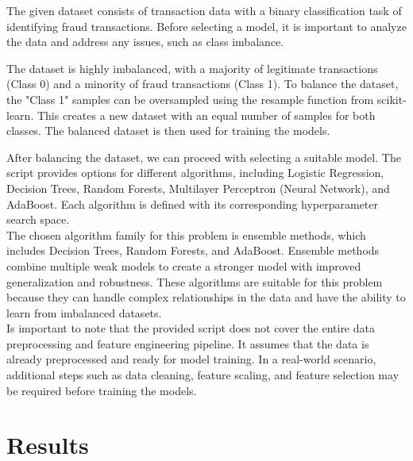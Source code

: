 \documentclass[a4, 10 pt, conference]{ieeeconf}  %
\begin{document}
{\color{black}

\begin{itemize} 
	\textbfn The given dataset consists of transaction data with a binary classification task of identifying fraud transactions. Before selecting a model, it is important to analyze the data and address any issues, such as class imbalance.\newline

	\textbfn The dataset is highly imbalanced, with a majority of legitimate transactions (Class 0) and a minority of fraud transactions (Class 1). To balance the dataset, the "Class 1" samples can be oversampled using the resample function from scikit-learn. This creates a new dataset with an equal number of samples for both classes. The balanced dataset is then used for training the models.\newline

	\textbfn After balancing the dataset, we can proceed with selecting a suitable model. The script provides options for different algorithms, including Logistic Regression, Decision Trees, Random Forests, Multilayer Perceptron (Neural Network), and AdaBoost. Each algorithm is defined with its corresponding hyperparameter search space.\\

	\textbfn The chosen algorithm family for this problem is ensemble methods, which includes Decision Trees, Random Forests, and AdaBoost. Ensemble methods combine multiple weak models to create a stronger model with improved generalization and robustness. These algorithms are suitable for this problem because they can handle complex relationships in the data and have the ability to learn from imbalanced datasets.\\

	\textbfnIt Is important to note that the provided script does not cover the entire data preprocessing and feature engineering pipeline. It assumes that the data is already preprocessed and ready for model training. In a real-world scenario, additional steps such as data cleaning, feature scaling, and feature selection may be required before training the models. 
\end{itemize}
}

\section{Results}
\label{sec:results}
\end{document}
